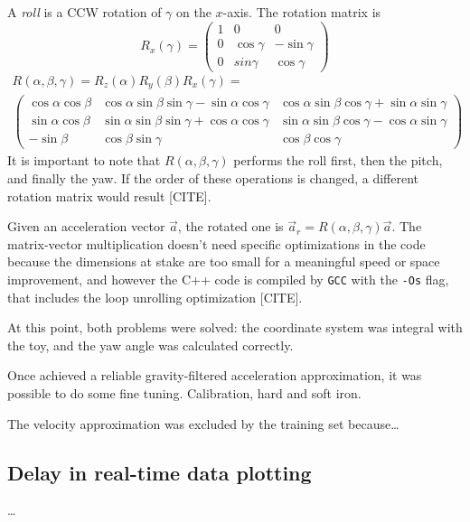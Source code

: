 A \textit{roll} is a CCW rotation of $\gamma$ on the $x$-axis. The rotation matrix is
\[
	R_x(\gamma) =
	\begin{pmatrix}
		1 & 0 & 0 \\
		0 & \cos\gamma & -\sin\gamma \\
		0 & sin\gamma & \cos\gamma
	\end{pmatrix}
\]
\begin{gather*}
	R(\alpha, \beta, \gamma) = R_z(\alpha) R_y(\beta) R_x(\gamma) = \\
	\begin{pmatrix}
		\cos\alpha \cos\beta & \cos\alpha \sin\beta \sin\gamma - \sin\alpha \cos\gamma & \cos\alpha \sin\beta \cos\gamma + \sin\alpha \sin\gamma \\
		\sin\alpha \cos\beta & \sin\alpha \sin\beta \sin\gamma + \cos\alpha \cos\gamma & \sin\alpha \sin\beta \cos\gamma - \cos\alpha \sin\gamma \\
		-\sin\beta & \cos\beta \sin\gamma & \cos\beta \cos\gamma
	\end{pmatrix}
\end{gather*}
It is important to note that $R(\alpha, \beta, \gamma)$ performs the roll first, then the pitch, and finally the yaw. If the order of these operations is changed, a different rotation matrix would result [CITE].
\bigbreak

Given an acceleration vector $\vec a$, the rotated one is $\vec a_r = R(\alpha, \beta, \gamma) \vec a$.
The matrix-vector multiplication doesn't need specific optimizations in the code because the dimensions at stake are too small for a meaningful speed or space improvement, and however the C++ code is compiled by \texttt{GCC} with the \texttt{-Os} flag, that includes the loop unrolling optimization [CITE].
\bigbreak

At this point, both problems were solved: the coordinate system was integral with the toy, and the yaw angle was calculated correctly.
\bigbreak

Once achieved a reliable gravity-filtered acceleration approximation, it was possible to do some fine tuning. Calibration, hard and soft iron.

The velocity approximation was excluded by the training set because\dots
\bigbreak

\subsection{Delay in real-time data plotting}
\dots
